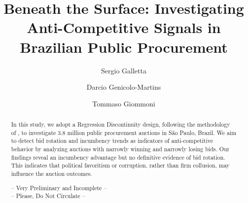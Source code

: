\documentclass[12 pt]{elsarticle}
\begin{document}
\begin{frontmatter}
\title{\textbf{Beneath the Surface: Investigating Anti-Competitive Signals in Brazilian Public Procurement}}
\author[ETH]{Sergio Galletta}
\author[INSPER]{Darcio Genicolo-Martins}
\author[ETH]{Tommaso Giommoni}
\address[ETH]{ETH Zürich}
\address[INSPER]{INSPER}


\begin{abstract}
In this study, we adopt a Regression Discontinuity design, following the methodology of \cite{kawai2023using}, to investigate 3.8 million public procurement auctions in São Paulo, Brazil. We aim to detect bid rotation and incumbency trends as indicators of anti-competitive behavior by analyzing auctions with narrowly winning and narrowly losing bids. Our findings reveal an incumbency advantage but no definitive evidence of bid rotation. This indicates that political favoritism or corruption, rather than firm collusion, may influence the auction outcomes.

\begin{center}
-- Very Preliminary and Incomplete --   \\
-- Please, Do Not Circulate --   
\end{center}
\end{abstract}
\end{frontmatter}

\bigskip

\clearpage

\end{document}

